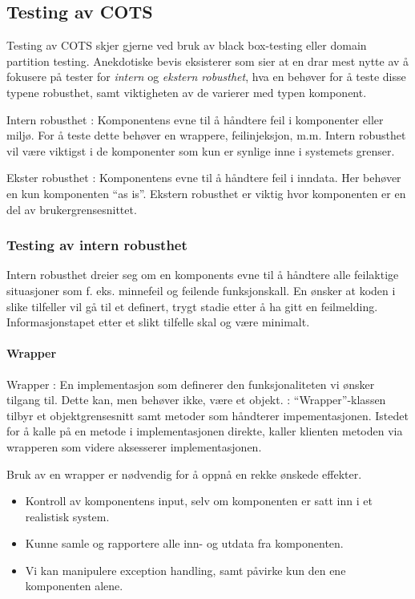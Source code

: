 \subsection{Testing av COTS}

Testing av COTS skjer gjerne ved bruk av black box-testing eller domain
partition testing. Anekdotiske bevis eksisterer som sier at en drar mest
nytte av å fokusere på tester for \emph{intern} og \emph{ekstern
robusthet}, hva en behøver for å teste disse typene robusthet, samt
viktigheten av de varierer med typen komponent.

Intern robusthet : Komponentens evne til å håndtere feil i komponenter
eller miljø. For å teste dette behøver en wrappere, feilinjeksjon, m.m.
Intern robusthet vil være viktigst i de komponenter som kun er synlige
inne i systemets grenser.

Ekster robusthet : Komponentens evne til å håndtere feil i inndata. Her
behøver en kun komponenten ``as is''. Ekstern robusthet er viktig hvor
komponenten er en del av brukergrensesnittet.

\subsubsection{Testing av intern robusthet}

Intern robusthet dreier seg om en komponents evne til å håndtere alle
feilaktige situasjoner som f. eks. minnefeil og feilende funksjonskall.
En ønsker at koden i slike tilfeller vil gå til et definert, trygt
stadie etter å ha gitt en feilmelding. Informasjonstapet etter et slikt
tilfelle skal og være minimalt.

\paragraph{Wrapper}

Wrapper : En implementasjon som definerer den funksjonaliteten vi ønsker
tilgang til. Dette kan, men behøver ikke, være et objekt. :
``Wrapper''-klassen tilbyr et objektgrensesnitt samt metoder som
håndterer impementasjonen. Istedet for å kalle på en metode i
implementasjonen direkte, kaller klienten metoden via wrapperen som
videre aksesserer implementasjonen.

Bruk av en wrapper er nødvendig for å oppnå en rekke ønskede effekter.

\begin{itemize}
\item
  Kontroll av komponentens input, selv om komponenten er satt inn i et
  realistisk system.
\item
  Kunne samle og rapportere alle inn- og utdata fra komponenten.
\item
  Vi kan manipulere exception handling, samt påvirke kun den ene
  komponenten alene.
\end{itemize}
